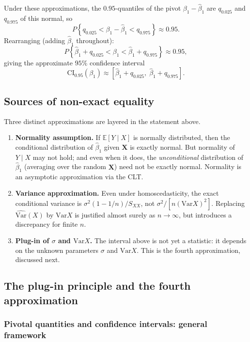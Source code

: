 \documentclass[a4paper,oneside,12pt]{extarticle}
\theoremstyle{plain}
\theoremstyle{definition}
\theoremstyle{remark}
\newcommand*{\E}{\mathbb{E}}
\newcommand*{\Var}{\mathrm{Var}}
\begin{document}
Under these approximations, the $0.95$-quantiles of the pivot
$\beta_1 - \hat\beta_1$ are $q_{0.025}$ and $q_{0.975}$ of this
normal, so
\[
  P\!\left\{q_{0.025} < \beta_1 - \hat\beta_1 < q_{0.975}\right\}
  \approx 0.95.
\]
Rearranging (adding $\hat\beta_1$ throughout):
\[
  P\!\left\{\hat\beta_1 + q_{0.025} < \beta_1 < \hat\beta_1 + q_{0.975}\right\}
  \approx 0.95,
\]
giving the approximate $95\%$ confidence interval
\[
  \mathrm{CI}_{0.95}(\beta_1)
  \approx \left[\hat\beta_1 + q_{0.025},\; \hat\beta_1 + q_{0.975}\right].
\]

\subsection{Sources of non-exact equality}

Three distinct approximations are layered in the statement above.

\begin{enumerate}
\item \textbf{Normality assumption.}  If $\E[Y \mid X]$ is normally
distributed, then the conditional distribution of $\hat\beta_1$ given
$\mathbf{X}$ is exactly normal.  But normality of $Y \mid X$ may not
hold; and even when it does, the \emph{unconditional} distribution of
$\hat\beta_1$ (averaging over the random $\mathbf{X}$) need not be
exactly normal.  Normality is an asymptotic approximation via the CLT.

\item \textbf{Variance approximation.}  Even under homoscedasticity,
the exact conditional variance is $\sigma^2(1-1/n)/S_{XX}$, not
$\sigma^2/[n(\Var X)^2]$.  Replacing $\widehat{\Var}(X)$ by $\Var X$
is justified almost surely as $n\to\infty$, but introduces a
discrepancy for finite $n$.

\item \textbf{Plug-in of $\sigma$ and $\Var X$.}  The interval above
is not yet a statistic: it depends on the unknown parameters $\sigma$
and $\Var X$.  This is the fourth approximation, discussed next.
\end{enumerate}

\subsection{The plug-in principle and the fourth approximation}

\subsubsection{Pivotal quantities and confidence intervals: general framework}
\end{document}
